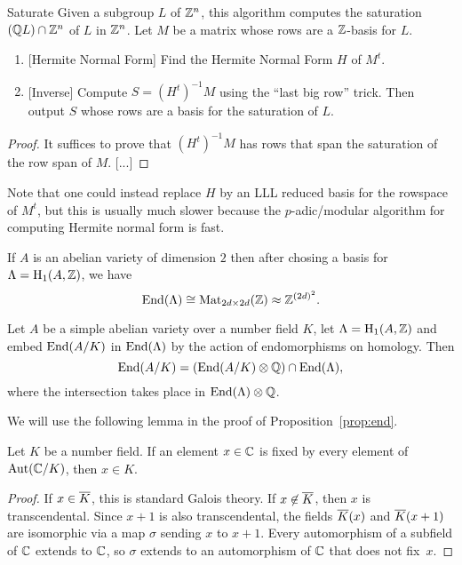 \documentclass{article}
\begin{document}
\begin{algorithm}{Saturate}
Given a subgroup $L$ of $\mathbb{Z}^n$, this algorithm computes
the saturation $(\mathbb{Q} L) \cap \mathbb{Z}^n$ of $L$ in $\mathbb{Z}^n$.
Let $M$ be a matrix whose rows are a $\mathbb{Z}$-basis for $L$.

\begin{enumerate}
\item{} [Hermite Normal Form] Find the Hermite Normal Form $H$ of $M^t$.
\item{} [Inverse] Compute $S = (H^t)^{-1} M$ using the ``last big row'' trick.
Then output $S$ whose rows are a basis for the saturation of $L$.
\end{enumerate}
\end{algorithm}
\begin{proof}
It suffices to prove that $(H^t)^{-1}M$ has rows that span the
saturation of the row span of $M$.
[...]
\end{proof}

Note that one could instead replace $H$ by an LLL reduced basis for
the rowspace of $M^t$, but this is usually much slower because the
$p$-adic/modular algorithm \cite{blah} for computing Hermite normal
form is fast.


If $A$ is an abelian variety of dimension $2$ then after chosing a basis for
$\Lambda = \operatorname{H}_1(A,\mathbb{Z})$, we have
$$
  \operatorname{End}(\Lambda)\cong \operatorname{Mat}_{2d\times 2d}(\mathbb{Z}) \approx \mathbb{Z}^{(2d)^2}.
$$

\begin{proposition}\label{prop:end}
Let $A$ be a simple abelian variety over a number field $K$,
let $\Lambda = \operatorname{H}_1(A,\mathbb{Z})$ and
embed $\operatorname{End}(A/K)$ in $\operatorname{End}(\Lambda)$
by the action of endomorphisms on homology.   Then
$$
  \operatorname{End}(A/K) = (\operatorname{End}(A/K)\otimes \mathbb{Q})\cap \operatorname{End}(\Lambda),
$$
where  the intersection takes place in $\operatorname{End}(\Lambda)\otimes\mathbb{Q}$.
\end{proposition}
We will use the following lemma in the proof of Proposition~\ref{prop:end}.
\begin{lemma}\label{lem:gal}
  Let $K$ be a number field.  If an element $x\in \mathbb{C}$ is fixed by
  every element of $\operatorname{Aut}(\mathbb{C}/K)$, then $x\in K$.
\end{lemma}
\begin{proof}
  If $x\in\overline{K}$, this is standard Galois theory.  If $x\not\in
  \overline{K}$, then $x$ is transcendental.  Since $x+1$ is also transcendental,
the fields $\overline{K}(x)$ and $\overline{K}(x+1)$ are isomorphic via a map $\sigma$
sending $x$ to $x+1$.  Every automorphism of a subfield of $\mathbb{C}$
extends to $\mathbb{C}$, so $\sigma$ extends to an automorphism of $\mathbb{C}$
that does not fix~$x$.
\end{proof}
\end{document}
